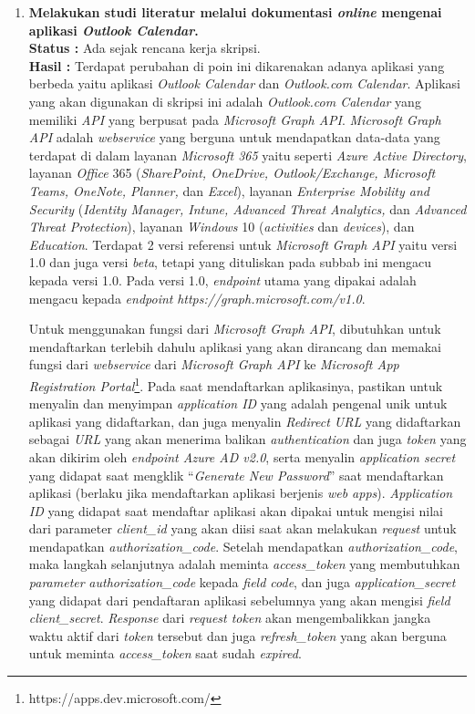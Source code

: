 \documentclass[a4paper,twoside]{article}
\begin{document}
\begin{enumerate}
		
		\item \textbf{Melakukan studi literatur melalui dokumentasi \textit{online} mengenai aplikasi \textit{Outlook Calendar}.}\\
		{\bf Status :} Ada sejak rencana kerja skripsi.\\
		{\bf Hasil :} Terdapat perubahan di poin ini dikarenakan adanya aplikasi yang berbeda yaitu aplikasi \textit{Outlook Calendar} dan \textit{Outlook.com Calendar}. Aplikasi yang akan digunakan di skripsi ini adalah \textit{Outlook.com Calendar} yang memiliki \textit{API} yang berpusat pada \textit{Microsoft Graph API}. \textit{Microsoft Graph API} adalah \textit{webservice} yang berguna untuk mendapatkan data-data yang terdapat di dalam layanan \textit{Microsoft 365} yaitu seperti \textit{Azure Active Directory}, layanan \textit{Office} 365 (\textit{SharePoint, OneDrive, Outlook/Exchange, Microsoft Teams, OneNote, Planner,} dan \textit{Excel}), layanan \textit{Enterprise Mobility and Security} (\textit{Identity Manager, Intune, Advanced Threat Analytics,} dan \textit{Advanced Threat Protection}), layanan \textit{Windows} 10 (\textit{activities} dan \textit{devices}), dan \textit{Education}. Terdapat 2 versi referensi untuk \textit{Microsoft Graph API} yaitu versi 1.0 dan juga versi \textit{beta}, tetapi yang dituliskan pada subbab ini mengacu kepada versi 1.0. Pada versi 1.0, \textit{endpoint} utama yang dipakai adalah mengacu kepada \textit{endpoint} \textit{https://graph.microsoft.com/v1.0}. 
		
		Untuk menggunakan fungsi dari \textit{Microsoft Graph API}, dibutuhkan untuk mendaftarkan terlebih dahulu aplikasi yang akan dirancang dan memakai fungsi dari \textit{webservice} dari \textit{Microsoft Graph API} ke \textit{Microsoft App Registration Portal}\footnote{https://apps.dev.microsoft.com/}. Pada saat mendaftarkan aplikasinya, pastikan untuk menyalin dan menyimpan \textit{application ID} yang adalah pengenal unik untuk aplikasi yang didaftarkan, dan juga menyalin \textit{Redirect URL} yang didaftarkan sebagai \textit{URL} yang akan menerima balikan \textit{authentication} dan juga \textit{token} yang akan dikirim oleh \textit{endpoint Azure AD v2.0}, serta menyalin \textit{application secret} yang didapat saat mengklik ``\textit{Generate New Password}'' saat mendaftarkan aplikasi (berlaku jika mendaftarkan aplikasi berjenis \textit{web apps}). \textit{Application ID} yang didapat saat mendaftar aplikasi akan dipakai untuk mengisi nilai dari parameter \textit{client\_id} yang akan diisi saat akan melakukan \textit{request} untuk mendapatkan \textit{authorization\_code}. Setelah mendapatkan \textit{authorization\_code}, maka langkah selanjutnya adalah meminta \textit{access\_token} yang membutuhkan \textit{parameter} \textit{authorization\_code} kepada \textit{field code}, dan juga \textit{application\_secret} yang didapat dari pendaftaran aplikasi sebelumnya yang akan mengisi \textit{field client\_secret}. \textit{Response} dari \textit{request token} akan mengembalikkan jangka waktu aktif dari \textit{token} tersebut dan juga \textit{refresh\_token} yang akan berguna untuk meminta \textit{access\_token} saat sudah \textit{expired}. 
		

\end{enumerate}
\end{document}
